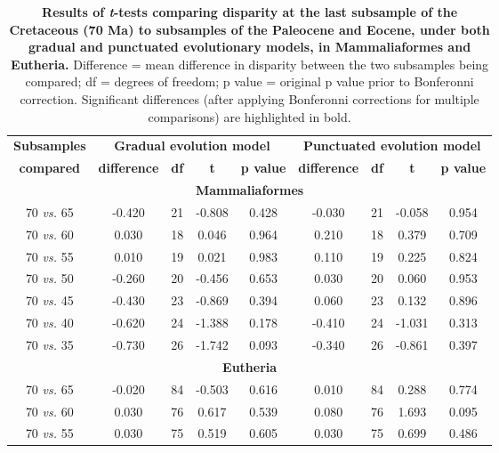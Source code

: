 \documentclass[10pt,letterpaper]{article}
\begin{document}
\begin{table}[!ht]
\begin{adjustwidth}{-2.25in}{0in} %
\caption{
{\bf Results of \textit{t}-tests comparing disparity at the last subsample of the Cretaceous (70 Ma) to subsamples of the Paleocene and Eocene, under both gradual and punctuated evolutionary models, in Mammaliaformes and Eutheria.}
Difference = mean difference in disparity between the two subsamples being compared; df = degrees of freedom; p value = original p value prior to Bonferonni correction. Significant differences (after applying Bonferonni corrections for multiple comparisons) are highlighted in bold.}
\begin{tabular}{|c|c|c|c|c|c|c|c|c|}
  \hline
  \textbf{Subsamples} & \multicolumn{4}{|c|}{\textbf{Gradual evolution model}} & \multicolumn{4}{|c|}{\textbf{Punctuated evolution model}} \\
  \textbf{compared} & \textbf{difference} & \textbf{df} & \textbf{t} & \textbf{p value} & \textbf{difference} & \textbf{df} & \textbf{t} & \textbf{p value} \\ 
  \hline
  \multicolumn{9}{|c|}{\textbf{Mammaliaformes}}\\
  \hline
  70 \textit{vs.} 65 & -0.420 & 21 & -0.808 & 0.428 & -0.030 & 21 & -0.058 & 0.954 \\ \hline
  70 \textit{vs.} 60 & 0.030 & 18 & 0.046 & 0.964 & 0.210 & 18 & 0.379 & 0.709 \\ \hline
  70 \textit{vs.} 55 & 0.010 & 19 & 0.021 & 0.983 & 0.110 & 19 & 0.225 & 0.824 \\ \hline
  70 \textit{vs.} 50 & -0.260 & 20 & -0.456 & 0.653 & 0.030 & 20 & 0.060 & 0.953 \\ \hline
  70 \textit{vs.} 45 & -0.430 & 23 & -0.869 & 0.394 & 0.060 & 23 & 0.132 & 0.896 \\ \hline
  70 \textit{vs.} 40 & -0.620 & 24 & -1.388 & 0.178 & -0.410 & 24 & -1.031 & 0.313 \\ \hline
  70 \textit{vs.} 35 & -0.730 & 26 & -1.742 & 0.093 & -0.340 & 26 & -0.861 & 0.397 \\
  \hline
  \multicolumn{9}{|c|}{\textbf{Eutheria}}\\
  \hline
  70 \textit{vs.} 65 & -0.020 & 84 & -0.503 & 0.616 & 0.010 & 84 & 0.288 & 0.774 \\ \hline
  70 \textit{vs.} 60 & 0.030 & 76 & 0.617 & 0.539 & 0.080 & 76 & 1.693 & 0.095 \\ \hline
  70 \textit{vs.} 55 & 0.030 & 75 & 0.519 & 0.605 & 0.030 & 75 & 0.699 & 0.486 \\ \hline

\end{tabular}
\end{adjustwidth}
\end{table}
\end{document}
